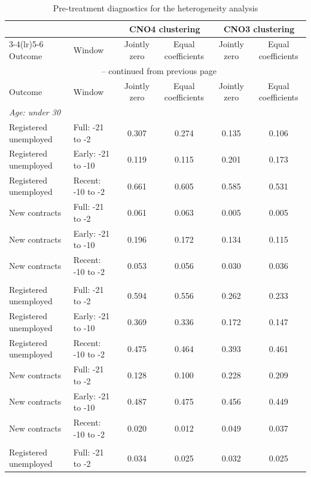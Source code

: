 \begingroup
\scriptsize
\setlength{\tabcolsep}{3.5pt}
\begin{longtable}{llcccc}
\caption{Pre-treatment diagnostics for the heterogeneity analysis}\label{tab:v1_heterogeneity_pretrends}\\
\toprule
& & \multicolumn{2}{c}{CNO4 clustering} & \multicolumn{2}{c}{CNO3 clustering} \\
\cmidrule(lr){3-4}\cmidrule(lr){5-6}
Outcome & Window & Jointly zero & Equal coefficients & Jointly zero & Equal coefficients \\
\midrule
\endfirsthead
\multicolumn{6}{c}{\tablename\ \thetable{} -- continued from previous page} \\
\toprule
Outcome & Window & Jointly zero & Equal coefficients & Jointly zero & Equal coefficients \\
\midrule
\endhead
\multicolumn{6}{l}{\textit{Age: under 30}} \\
Registered unemployed & Full: -21 to -2 & 0.307 & 0.274 & 0.135 & 0.106 \\
Registered unemployed & Early: -21 to -10 & 0.119 & 0.115 & 0.201 & 0.173 \\
Registered unemployed & Recent: -10 to -2 & 0.661 & 0.605 & 0.585 & 0.531 \\
New contracts & Full: -21 to -2 & 0.061 & 0.063 & 0.005 & 0.005 \\
New contracts & Early: -21 to -10 & 0.196 & 0.172 & 0.134 & 0.115 \\
New contracts & Recent: -10 to -2 & 0.053 & 0.056 & 0.030 & 0.036 \\
\addlinespace
\multicolumn{6}{l}{\textit{Age: 30--39}} \\
Registered unemployed & Full: -21 to -2 & 0.594 & 0.556 & 0.262 & 0.233 \\
Registered unemployed & Early: -21 to -10 & 0.369 & 0.336 & 0.172 & 0.147 \\
Registered unemployed & Recent: -10 to -2 & 0.475 & 0.464 & 0.393 & 0.461 \\
New contracts & Full: -21 to -2 & 0.128 & 0.100 & 0.228 & 0.209 \\
New contracts & Early: -21 to -10 & 0.487 & 0.475 & 0.456 & 0.449 \\
New contracts & Recent: -10 to -2 & 0.020 & 0.012 & 0.049 & 0.037 \\
\addlinespace
\multicolumn{6}{l}{\textit{Age: 40 or older}} \\
Registered unemployed & Full: -21 to -2 & 0.034 & 0.025 & 0.032 & 0.025 \\

\end{longtable}
